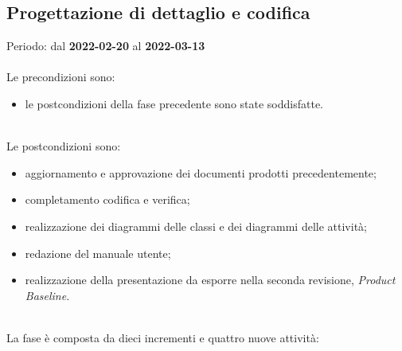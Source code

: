 \subsection{Progettazione di dettaglio e codifica}
Periodo: dal \textbf{2022-02-20} al \textbf{2022-03-13} \mbox{} \\ \mbox{} \\
Le precondizioni sono:
\begin{itemize}
	\item le postcondizioni della fase precedente sono state soddisfatte.
\end{itemize} \mbox{} \\
Le postcondizioni sono:
\begin{itemize}
	\item aggiornamento e approvazione dei documenti prodotti precedentemente;
	\item completamento codifica e verifica;
	\item realizzazione dei diagrammi delle classi e dei diagrammi delle attività;
	\item redazione del manuale utente;
	\item realizzazione della presentazione da esporre nella seconda revisione, \textit{Product Baseline}. 
\end{itemize} \mbox{} \\
La fase è composta da dieci incrementi e quattro nuove attività:
